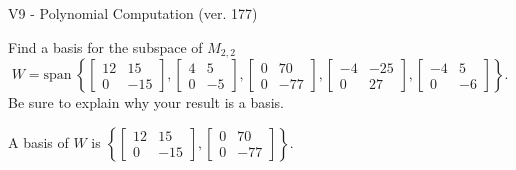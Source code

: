 \begin{exercise}
  \begin{exerciseTitle}V9 - Polynomial Computation (ver. 177)\end{exerciseTitle}
  \begin{exerciseStatement}
    Find a basis for the subspace of \(M_{2,2}\) 
\[W=\mathrm{span}\ \left\{\left[\begin{array}{cc}
12 & 15 \\
0 & -15
\end{array}\right] , \left[\begin{array}{cc}
4 & 5 \\
0 & -5
\end{array}\right] , \left[\begin{array}{cc}
0 & 70 \\
0 & -77
\end{array}\right] , \left[\begin{array}{cc}
-4 & -25 \\
0 & 27
\end{array}\right] , \left[\begin{array}{cc}
-4 & 5 \\
0 & -6
\end{array}\right]\right\}.\]
 Be sure to explain why your result is a basis.


  \end{exerciseStatement}
  \begin{exerciseAnswer}
   A basis of \(W\) is  \(\left\{\left[\begin{array}{cc}
12 & 15 \\
0 & -15
\end{array}\right] , \left[\begin{array}{cc}
0 & 70 \\
0 & -77
\end{array}\right]\right\}\).
  


  \end{exerciseAnswer}
\end{exercise}